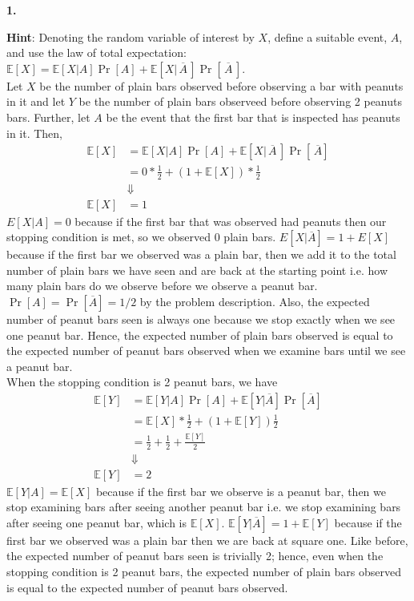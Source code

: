 \documentclass[12pt]{amsart}
\newenvironment{statement}[1]{\smallskip\noindent\color[rgb]{0.0,0.0,0.0} {\bf #1.}}{}
\theoremstyle{definition}
\theoremstyle{remark}
\newcommand{\E}{\mathbb{E}}
\newcommand{\1}{\mathds{1}}
\begin{document}
\begin{statement}{1}
\begin{enumerate}
    \noindent\textbf{Hint}: Denoting the random variable of interest by $X$, define a suitable event, $A$, and use the law of total expectation: $\E[X] = \E[X|A]\Pr[A] + \E\left[X|\,\overline{A}\,\right]\Pr\left[\,\overline{A}\,\right]$.
    \\ 
    Let $X$ be the number of plain bars observed before observing a bar with peanuts in it and let $Y$ be the number of plain 
    bars observeed before observing 2 peanuts bars. Further, let $A$ be the event that the first bar that is inspected has peanuts in it.
    Then, 
    \begin{align*}
        \E[X] &= \E[X|A]\Pr[A] + \E\left[X|\,\overline{A}\,\right]\Pr[\,\overline{A}]\\ 
        &= 0*\frac{1}{2} + (1 + \E[X])*\frac{1}{2}\\ 
        &\Downarrow\\ 
        \E[X] &= 1
    \end{align*}
    $E[X|A] = 0$ because if the first bar that was observed had peanuts then our stopping condition is met, so we observed 
    0 plain bars. $E[X|\overline{A}] = 1 + E[X]$ because if the first bar we observed was a plain bar, then we add it to the total 
    number of plain bars we have seen and are back at the starting point i.e. how many plain bars do we observe before we observe a peanut 
    bar. $\Pr[A] = \Pr[\overline{A}] = 1/2$ by the problem description. Also, the expected number of peanut bars seen is always one because 
    we stop exactly when we see one peanut bar. Hence, the expected number of plain bars observed is equal to the expected number of peanut bars 
    observed when we examine bars until we see a peanut bar. \\When the stopping condition is 2 peanut bars, we have 
    \begin{align*}
        \E[Y] &= \E[Y|A]\Pr[A] + \E[Y|\overline{A}]\Pr[\overline{A}]\\
        &= \E[X]*\frac{1}{2} + (1 + \E[Y])\frac{1}{2} \\ 
        &= \frac{1}{2} + \frac{1}{2} + \frac{\E[Y]}{2} \\ 
        &\Downarrow\\ 
        \E[Y] &= 2
    \end{align*}
    $\E[Y|A] = \E[X]$ because if the first bar we observe is a peanut bar, then we stop examining bars after seeing another peanut bar i.e. we 
    stop examining bars after seeing one peanut bar, which is $\E[X]$. $\E[Y|\overline{A}] = 1 + \E[Y]$ because if the first bar 
    we observed was a plain bar then we are back at square one. Like before, the expected number of peanut bars seen is trivially 2; hence, 
    even when the stopping condition is 2 peanut bars, the expected number of plain bars observed is equal to the expected number of peanut bars 
    observed. 
\end{enumerate}
\end{statement}
\end{document}
